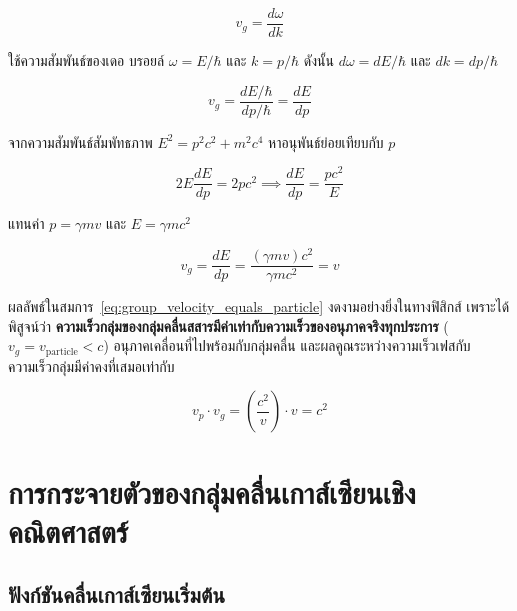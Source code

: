 \begin{equation}
v_g = \frac{d\omega}{dk}
\label{eq:group_velocity_def}
\end{equation}

ใช้ความสัมพันธ์ของเดอ บรอยล์ $\omega = E/\hbar$ และ $k = p/\hbar$ ดังนั้น $d\omega = dE/\hbar$ และ $dk = dp/\hbar$

\begin{equation}
v_g = \frac{dE/\hbar}{dp/\hbar} = \frac{dE}{dp}
\label{eq:group_velocity_dEdp}
\end{equation}

จากความสัมพันธ์สัมพัทธภาพ $E^2 = p^2 c^2 + m^2 c^4$ หาอนุพันธ์ย่อยเทียบกับ $p$

\begin{equation}
2 E \frac{dE}{dp} = 2 p c^2 \implies \frac{dE}{dp} = \frac{p c^2}{E}
\end{equation}

แทนค่า $p = \gamma m v$ และ $E = \gamma m c^2$

\begin{equation}
v_g = \frac{dE}{dp} = \frac{(\gamma m v) c^2}{\gamma m c^2} = v
\label{eq:group_velocity_equals_particle}
\end{equation}

ผลลัพธ์ในสมการ~\eqref{eq:group_velocity_equals_particle} งดงามอย่างยิ่งในทางฟิสิกส์ เพราะได้พิสูจน์ว่า \textbf{ความเร็วกลุ่มของกลุ่มคลื่นสสารมีค่าเท่ากับความเร็วของอนุภาคจริงทุกประการ} ($v_g = v_{\text{particle}} < c$) อนุภาคเคลื่อนที่ไปพร้อมกับกลุ่มคลื่น และผลคูณระหว่างความเร็วเฟสกับความเร็วกลุ่มมีค่าคงที่เสมอเท่ากับ

\begin{equation}
v_p \cdot v_g = \left( \frac{c^2}{v} \right) \cdot v = c^2
\label{eq:vp_vg_c2}
\end{equation}

\section{การกระจายตัวของกลุ่มคลื่นเกาส์เซียนเชิงคณิตศาสตร์}

\subsection{ฟังก์ชันคลื่นเกาส์เซียนเริ่มต้น}


